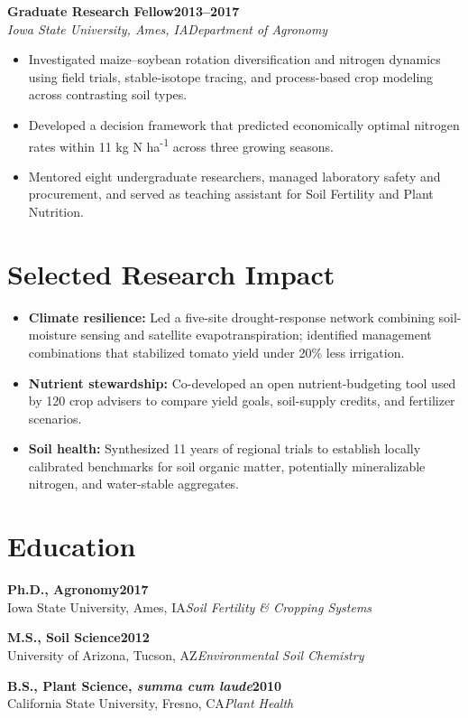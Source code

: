 \documentclass[10pt,letterpaper]{article}
\newcommand{\role}[4]{%
  \textbf{#1}\hfill\textbf{#2}\\[-1pt]
  \textit{#3}\hfill\textit{#4}\par
}
\newcommand{\education}[4]{%
  \textbf{#1}\hfill\textbf{#2}\\[-1pt]
  #3\hfill\textit{#4}\par
}
\begin{document}
\newpage
\role{Graduate Research Fellow}{2013--2017}{Iowa State University, Ames, IA}{Department of Agronomy}
\begin{itemize}
  \item Investigated maize--soybean rotation diversification and nitrogen dynamics using field trials, stable-isotope tracing, and process-based crop modeling across contrasting soil types.
  \item Developed a decision framework that predicted economically optimal nitrogen rates within 11 kg N ha\textsuperscript{-1} across three growing seasons.
  \item Mentored eight undergraduate researchers, managed laboratory safety and procurement, and served as teaching assistant for Soil Fertility and Plant Nutrition.
\end{itemize}

\section*{Selected Research Impact}
\begin{itemize}
  \item \textbf{Climate resilience:} Led a five-site drought-response network combining soil-moisture sensing and satellite evapotranspiration; identified management combinations that stabilized tomato yield under 20\% less irrigation.
  \item \textbf{Nutrient stewardship:} Co-developed an open nutrient-budgeting tool used by 120 crop advisers to compare yield goals, soil-supply credits, and fertilizer scenarios.
  \item \textbf{Soil health:} Synthesized 11 years of regional trials to establish locally calibrated benchmarks for soil organic matter, potentially mineralizable nitrogen, and water-stable aggregates.
\end{itemize}

\section*{Education}
\education{Ph.D., Agronomy}{2017}{Iowa State University, Ames, IA}{Soil Fertility \& Cropping Systems}
\vspace{3pt}
\education{M.S., Soil Science}{2012}{University of Arizona, Tucson, AZ}{Environmental Soil Chemistry}
\vspace{3pt}
\education{B.S., Plant Science, \textit{summa cum laude}}{2010}{California State University, Fresno, CA}{Plant Health}
\end{document}
